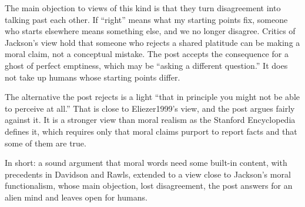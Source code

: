 \begin{afterword}
The main objection to views of this kind is that they turn disagreement into talking past each other. If ``right'' means what my starting points fix, someone who starts elsewhere means something else, and we no longer disagree. Critics of Jackson's view hold that someone who rejects a shared platitude can be making a moral claim, not a conceptual mistake. The post accepts the consequence for a ghost of perfect emptiness, which may be ``asking a different question.'' It does not take up humans whose starting points differ.

The alternative the post rejects is a light ``that in principle you might not be able to perceive at all.'' That is close to Eliezer1999's view, and the post argues fairly against it. It is a stronger view than moral realism as the Stanford Encyclopedia defines it, which requires only that moral claims purport to report facts and that some of them are true.

In short: a sound argument that moral words need some built-in content, with precedents in Davidson and Rawls, extended to a view close to Jackson's moral functionalism, whose main objection, lost disagreement, the post answers for an alien mind and leaves open for humans.
\end{afterword}
